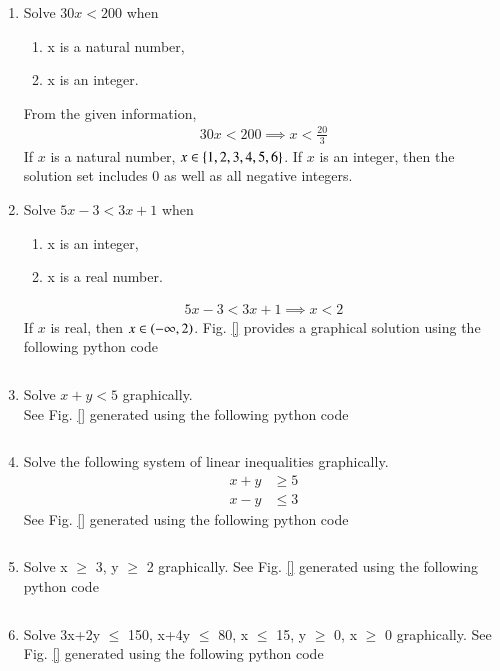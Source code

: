 \renewcommand{\theequation}{\theenumi}
\begin{enumerate}[label=\arabic*.,ref=\thesubsection.\theenumi]
    \item Solve $30x < 200$ when
    \begin{enumerate} 
    \item  x is a natural number,
    \item x is an integer.
\end{enumerate}
\solution From the given information, 
\begin{align}
30x < 200 \implies x < \frac{20}{3}
\label{eq:lineq_nat}
\end{align}
If $x$ is a natural number, $x \in \left\{1, 2, 3, 4, 5, 6\right\}$. If $x$ is an integer, then the solution set includes 0 as well as all negative integers.
    \item Solve $5x-3 < 3x+1$ when
    \begin{enumerate} 
\item  x is an integer,
    \item x is a real number.
\end{enumerate}
\solution 
\begin{align}
5x-3 < 3x+1 \implies x < 2
\label{eq:lineq_real}
\end{align}
%
If $x$ is real, then $x \in \left(-\infty, 2\right)$. Fig. \ref{} provides a graphical solution using the following python code
\begin{lstlisting}
\end{lstlisting}
\item   Solve    $x+y < 5$ graphically.
\\
\solution  See Fig. \ref{} generated using the following python code
\begin{lstlisting}
\end{lstlisting}
    \item Solve the following system of linear inequalities graphically.
\begin{align}
    x+y &\geq 5
\\
    x-y &\leq 3
\label{eq:lineq_real}
\end{align}
\solution  See Fig. \ref{} generated using the following python code
\begin{lstlisting}
\end{lstlisting}
\item Solve  x $\geq$ 3, y $\geq$ 2 graphically.
\solution  See Fig. \ref{} generated using the following python code
\begin{lstlisting}
\end{lstlisting}
    \item Solve 3x+2y $\leq$ 150, x+4y $\leq$ 80, x $\leq$ 15, y $\geq$ 0,
    x $\geq$ 0 graphically.    
\solution  See Fig. \ref{} generated using the following python code
\begin{lstlisting}
\end{lstlisting}
   
    \end{enumerate}
